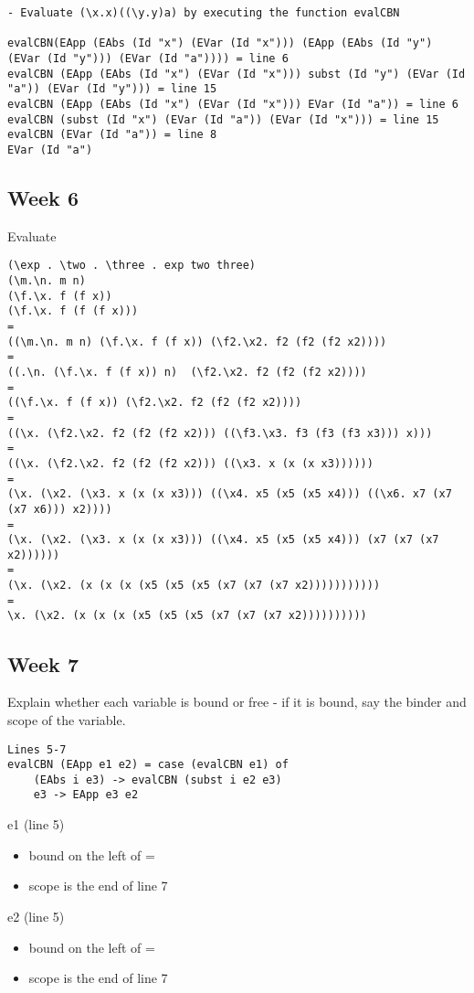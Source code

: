 \documentclass{article}
\theoremstyle{theorem}
\theoremstyle{definition}
\theoremstyle{remark}
\begin{document}
\begin{lstlisting}
- Evaluate (\x.x)((\y.y)a) by executing the function evalCBN

evalCBN(EApp (EAbs (Id "x") (EVar (Id "x"))) (EApp (EAbs (Id "y") (EVar (Id "y"))) (EVar (Id "a")))) = line 6
evalCBN (EApp (EAbs (Id "x") (EVar (Id "x"))) subst (Id "y") (EVar (Id "a")) (EVar (Id "y"))) = line 15
evalCBN (EApp (EAbs (Id "x") (EVar (Id "x"))) EVar (Id "a")) = line 6
evalCBN (subst (Id "x") (EVar (Id "a")) (EVar (Id "x"))) = line 15
evalCBN (EVar (Id "a")) = line 8
EVar (Id "a")
\end{lstlisting}
%

\subsection{Week 6}
Evaluate
\begin{lstlisting}
(\exp . \two . \three . exp two three)
(\m.\n. m n)
(\f.\x. f (f x))
(\f.\x. f (f (f x)))
=
((\m.\n. m n) (\f.\x. f (f x)) (\f2.\x2. f2 (f2 (f2 x2))))
=
((.\n. (\f.\x. f (f x)) n)  (\f2.\x2. f2 (f2 (f2 x2))))
=
((\f.\x. f (f x)) (\f2.\x2. f2 (f2 (f2 x2))))
=
((\x. (\f2.\x2. f2 (f2 (f2 x2))) ((\f3.\x3. f3 (f3 (f3 x3))) x)))
=
((\x. (\f2.\x2. f2 (f2 (f2 x2))) ((\x3. x (x (x x3))))))
=
(\x. (\x2. (\x3. x (x (x x3))) ((\x4. x5 (x5 (x5 x4))) ((\x6. x7 (x7 (x7 x6))) x2))))
=
(\x. (\x2. (\x3. x (x (x x3))) ((\x4. x5 (x5 (x5 x4))) (x7 (x7 (x7 x2))))))
=
(\x. (\x2. (x (x (x (x5 (x5 (x5 (x7 (x7 (x7 x2)))))))))))
=
\x. (\x2. (x (x (x (x5 (x5 (x5 (x7 (x7 (x7 x2))))))))))
\end{lstlisting}
%

\subsection{Week 7}
Explain whether each variable is bound or free - if it is bound, say the binder and scope of the variable.
\begin{lstlisting}
Lines 5-7
evalCBN (EApp e1 e2) = case (evalCBN e1) of
    (EAbs i e3) -> evalCBN (subst i e2 e3)
    e3 -> EApp e3 e2
\end{lstlisting}
%

\indent
e1 (line 5)
\begin{itemize}
  \item bound on the left of =
  \item scope is the end of line 7
\end{itemize}

\indent
e2 (line 5)
\begin{itemize}
  \item bound on the left of =
  \item scope is the end of line 7
\end{itemize}
\end{document}

